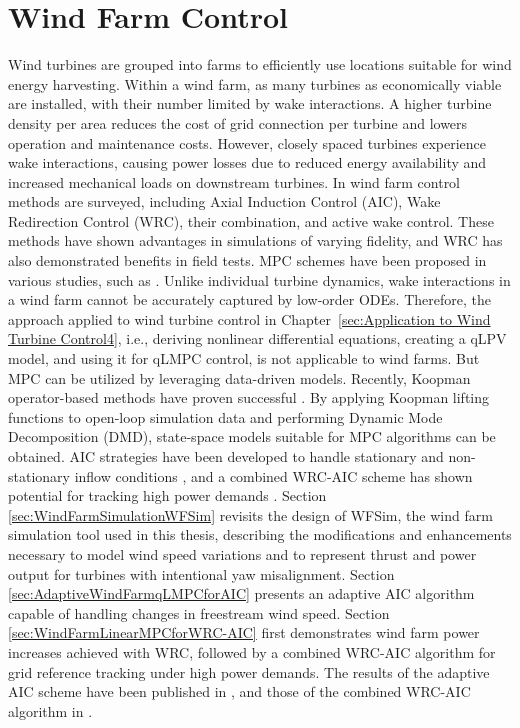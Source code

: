 \chapter{Wind Farm Control} \label{sec:ApplicationtoWindFarmControl}

Wind turbines are grouped into farms to efficiently use locations suitable for wind energy harvesting. Within a wind farm, as many turbines as economically viable are installed, with their number limited by wake interactions. A higher turbine density per area reduces the cost of grid connection per turbine and lowers operation and maintenance costs. However, closely spaced turbines experience wake interactions, causing power losses due to reduced energy availability and increased mechanical loads on downstream turbines.
In \cite{houck2022review} wind farm control methods are surveyed, including Axial Induction Control (AIC), Wake Redirection Control (WRC), their combination, and active wake control. These methods have shown advantages in simulations of varying fidelity, and WRC has also demonstrated benefits in field tests. MPC schemes have been proposed in various studies, such as \cite{spudic2014distMPC_https://doi.org/10.1002/oca.2136, zhao2016coordinated, bay2018active, vali2019adjoint}. Unlike individual turbine dynamics, wake interactions in a wind farm cannot be accurately captured by low-order ODEs. Therefore, the approach applied to wind turbine control in Chapter~\ref{sec:Application to Wind Turbine Control4}, i.e., deriving nonlinear differential equations, creating a qLPV model, and using it for qLMPC control, is not applicable to wind farms. But MPC can be utilized by leveraging data-driven models. Recently, Koopman operator-based methods have proven successful \cite{castillo2020wind, cassamo2021model}. By applying Koopman lifting functions to open-loop simulation data and performing Dynamic Mode Decomposition (DMD), state-space models suitable for MPC algorithms can be obtained. AIC strategies have been developed to handle stationary \cite{sharan2022Koopman} and non-stationary inflow conditions \cite{dittmer2022data}, and a combined WRC-AIC scheme has shown potential for tracking high power demands \cite{dittmer2023koopman}.
%
Section \ref{sec:WindFarmSimulationWFSim} revisits the design of WFSim, the wind farm simulation tool used in this thesis, describing the modifications and enhancements necessary to model wind speed variations and to represent thrust and power output for turbines with intentional yaw misalignment. Section \ref{sec:AdaptiveWindFarmqLMPCforAIC} presents an adaptive AIC algorithm capable of handling changes in freestream wind speed. Section \ref{sec:WindFarmLinearMPCforWRC-AIC} first demonstrates wind farm power increases achieved with WRC, followed by a combined WRC-AIC algorithm for grid reference tracking under high power demands. The results of the adaptive AIC scheme have been published in \cite{dittmer2022data}, and those of the combined WRC-AIC algorithm in \cite{dittmer2023koopman}.

